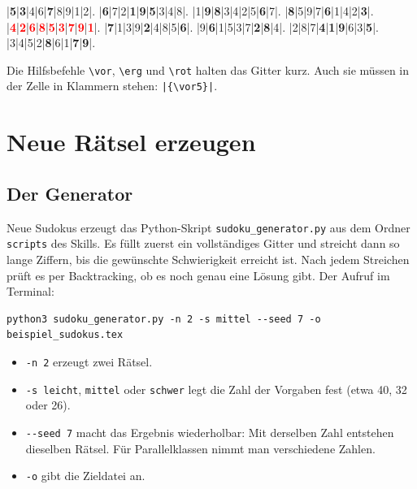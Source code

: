 \begin{ausgabe}
\setlength\sudokusize{6cm}
\renewcommand*\sudokuformat[1]{\Large\sffamily#1}
\newcommand\vor[1]{{\textbf{#1}}}
\newcommand\erg[1]{{\textcolor{black!45}{#1}}}
\newcommand\rot[1]{{\textcolor{red}{\textbf{#1}}}}
\begin{sudoku}
|{\vor5}|{\vor3}|{\erg4}|{\erg6}|{\vor7}|{\erg8}|{\erg9}|{\erg1}|{\erg2}|.
|{\vor6}|{\erg7}|{\erg2}|{\vor1}|{\vor9}|{\vor5}|{\erg3}|{\erg4}|{\erg8}|.
|{\erg1}|{\vor9}|{\vor8}|{\erg3}|{\erg4}|{\erg2}|{\erg5}|{\vor6}|{\erg7}|.
|{\vor8}|{\erg5}|{\erg9}|{\erg7}|{\vor6}|{\erg1}|{\erg4}|{\erg2}|{\vor3}|.
|{\rot4}|{\rot2}|{\rot6}|{\rot8}|{\rot5}|{\rot3}|{\rot7}|{\rot9}|{\rot1}|.
|{\vor7}|{\erg1}|{\erg3}|{\erg9}|{\vor2}|{\erg4}|{\erg8}|{\erg5}|{\vor6}|.
|{\erg9}|{\vor6}|{\erg1}|{\erg5}|{\erg3}|{\erg7}|{\vor2}|{\vor8}|{\erg4}|.
|{\erg2}|{\erg8}|{\erg7}|{\vor4}|{\vor1}|{\vor9}|{\erg6}|{\erg3}|{\vor5}|.
|{\erg3}|{\erg4}|{\erg5}|{\erg2}|{\vor8}|{\erg6}|{\erg1}|{\vor7}|{\vor9}|.
\end{sudoku}
\end{ausgabe}

Die Hilfsbefehle \texttt{\textbackslash vor}, \texttt{\textbackslash erg} und \texttt{\textbackslash rot} halten das Gitter kurz. Auch sie müssen in der Zelle in Klammern stehen: \texttt{|\{\textbackslash vor5\}|}.



\section{Neue Rätsel erzeugen}


\subsection{Der Generator}

Neue Sudokus erzeugt das Python-Skript \texttt{sudoku\_generator.py} aus dem Ordner \texttt{scripts} des Skills. Es füllt zuerst ein vollständiges Gitter und streicht dann so lange Ziffern, bis die gewünschte Schwierigkeit erreicht ist. Nach jedem Streichen prüft es per Backtracking, ob es noch genau eine Lösung gibt. Der Aufruf im Terminal:

\begin{lstlisting}[style=latex]
python3 sudoku_generator.py -n 2 -s mittel --seed 7 -o beispiel_sudokus.tex
\end{lstlisting}

\begin{itemize}
	\item \texttt{-n 2} erzeugt zwei Rätsel.
	\item \texttt{-s leicht}, \texttt{mittel} oder \texttt{schwer} legt die Zahl der Vorgaben fest (etwa 40, 32 oder 26).
	\item \texttt{-{}-seed 7} macht das Ergebnis wiederholbar: Mit derselben Zahl entstehen dieselben Rätsel. Für Parallelklassen nimmt man verschiedene Zahlen.
	\item \texttt{-o} gibt die Zieldatei an.
\end{itemize}


